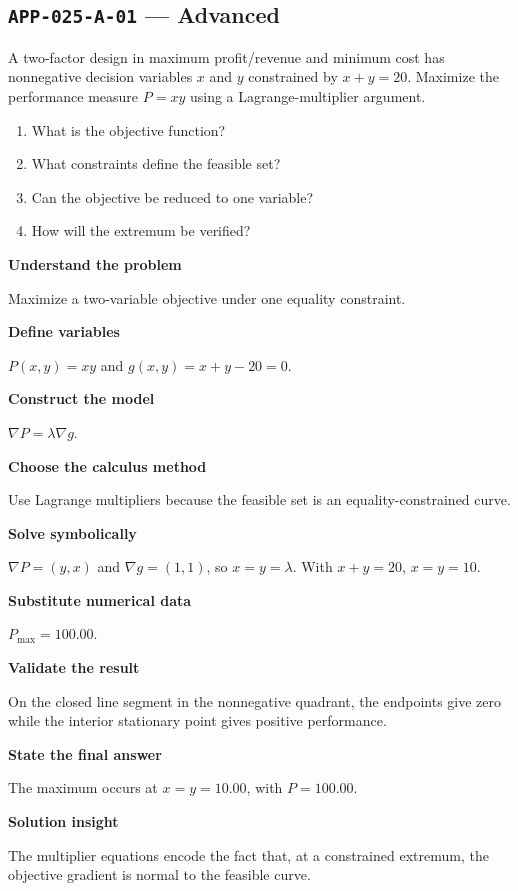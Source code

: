 \documentclass[11pt]{book}
\newcommand{\pid}[1]{\texttt{#1}}
\begin{document}
\subsection*{\pid{APP-025-A-01} — Advanced}
\begin{problembox}
A two-factor design in maximum profit/revenue and minimum cost has nonnegative decision variables $x$ and $y$ constrained by $x+y=20$. Maximize the performance measure $P=xy$ using a Lagrange-multiplier argument.
\end{problembox}
\begin{promptbox}\begin{enumerate}
\item What is the objective function?
\item What constraints define the feasible set?
\item Can the objective be reduced to one variable?
\item How will the extremum be verified?
\end{enumerate}\end{promptbox}
\begin{solutionbox}
\textbf{Understand the problem}\par Maximize a two-variable objective under one equality constraint.\par\medskip
\textbf{Define variables}\par $P(x,y)=xy$ and $g(x,y)=x+y-20=0$.\par\medskip
\textbf{Construct the model}\par $\nabla P=\lambda\nabla g$.\par\medskip
\textbf{Choose the calculus method}\par Use Lagrange multipliers because the feasible set is an equality-constrained curve.\par\medskip
\textbf{Solve symbolically}\par $\nabla P=(y,x)$ and $\nabla g=(1,1)$, so $x=y=\lambda$. With $x+y=20$, $x=y=10$.\par\medskip
\textbf{Substitute numerical data}\par $P_{\max}=100.00$.\par\medskip
\textbf{Validate the result}\par On the closed line segment in the nonnegative quadrant, the endpoints give zero while the interior stationary point gives positive performance.\par\medskip
\textbf{State the final answer}\par The maximum occurs at $x=y=10.00$, with $P=100.00$.\par\medskip
\textbf{Solution insight}\par The multiplier equations encode the fact that, at a constrained extremum, the objective gradient is normal to the feasible curve.\par\medskip
\end{solutionbox}
\end{document}
